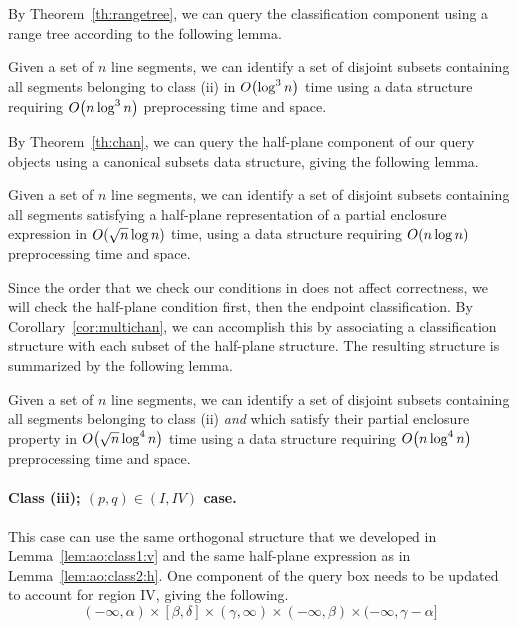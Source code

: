 By Theorem~\ref{th:rangetree}, we can query the classification component using a range tree according to the following lemma.
\begin{lemma}
\label{lem:ao:class2:v}
Given a set of $n$ line segments, we can identify a set of disjoint subsets containing all segments belonging to class (ii) in $O\!\left(\log^3{n}\right)$ time using a data structure requiring $O\!\left(n\log^3{n}\right)$ preprocessing time and space.
\end{lemma}

By Theorem~\ref{th:chan}, we can query the half-plane component of our query objects using a canonical subsets data structure, giving the following lemma.

\begin{lemma}
\label{lem:ao:class2:h}
Given a set of $n$ line segments, we can identify a set of disjoint subsets containing all segments satisfying a half-plane representation of a partial enclosure expression in $O\!\left(\sqrt{n}\log{n}\right)$ time, using a data structure requiring $O\!\left(n\log{n}\right)$ preprocessing time and space.
\end{lemma}

Since the order that we check our conditions in does not affect correctness, we will check the half-plane condition first, then the endpoint classification.  
By Corollary~\ref{cor:multichan}, we can accomplish this by associating a classification structure with each subset of the half-plane structure. The resulting structure is summarized by the following lemma.

\begin{lemma}
\label{lem:ao:class2:c}
Given a set of $n$ line segments, we can identify a set of disjoint subsets containing all segments belonging to class (ii) \emph{and} which satisfy their partial enclosure property in $O\!\left(\sqrt{n}\log^4{n}\right)$ time using a data structure requiring $O\!\left(n\log^4{n}\right)$ preprocessing time and space.
\end{lemma}


\paragraph{Class (iii); $(p, q) \in (I, IV)$ case.} 
This case can use the same orthogonal structure that we developed in Lemma~\ref{lem:ao:class1:v} and the same half-plane expression as in Lemma~\ref{lem:ao:class2:h}. 
One component of the query box needs to be updated to account for region IV, giving the following.
\[
(-\infty, \alpha) \times [\beta, \delta] \times (\gamma, \infty) \times (-\infty, \beta) \times (-\infty, \gamma - \alpha]
\]


